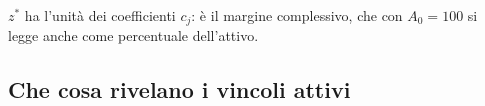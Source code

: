 \begin{frame}
\begin{stepitemize}
\item $z^{*}$ ha l'unit\`{a} dei coefficienti $c_{j}$: \`{e} il margine
complessivo, che con $A_{0}=100$ si legge anche come percentuale dell'attivo.
\end{stepitemize}

%

\transboxout
\end{frame}%




\subsection{Che cosa rivelano i vincoli attivi}%

